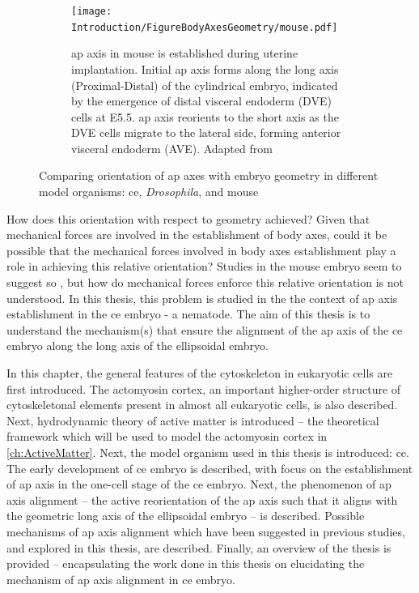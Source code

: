\begin{figure}[p]
\begin{subfigure}{\textwidth}
\end{subfigure}
\hfill
\begin{subfigure}{\textwidth}
    \centering
    \texttt{[image: Introduction/FigureBodyAxesGeometry/mouse.pdf]}
    \caption{\acs{ap} axis in mouse is established during uterine implantation. Initial \acs{ap} axis forms along the long axis (Proximal-Distal) of the cylindrical embryo, indicated by the emergence of distal visceral endoderm (DVE) cells at E5.5. \acs{ap} axis reorients to the short axis as the DVE cells migrate to the lateral side, forming anterior visceral endoderm (AVE). Adapted from \cite{matsuo2017mechanical}}
    \label{subfig:compareBodyAxesEmbryoGeometry-apAxisMouse}
\end{subfigure}

\caption[Comparing orientation of \acs{ap} axis with geometry]{Comparing orientation of \acs{ap} axes with embryo geometry in different model organisms: \acs{ce}, \textit{Drosophila}, and mouse}
\label{fig:compareBodyAxesEmbryoGeometry}

\end{figure}

How does this orientation with respect to geometry achieved? Given that mechanical forces are involved in the establishment of body axes, could it be possible that the mechanical forces involved in body axes establishment play a role in achieving this relative orientation? Studies in the mouse embryo seem to suggest so \citep{vianello2019understanding,hiramatsu2013external,matsuo2017mechanical}, but how do mechanical forces enforce this relative orientation is not understood. In this thesis, this problem is studied in the the context of \ac{ap} axis establishment in the \ac{ce} embryo - a nematode. The aim of this thesis is to understand the mechanism(s) that ensure the alignment of the \ac{ap} axis of the \ac{ce} embryo along the long axis of the ellipsoidal embryo. 

In this chapter, the general features of the cytoskeleton in eukaryotic cells are first introduced. The actomyosin cortex, an important higher-order structure of cytoskeletonal elements present in almost all eukaryotic cells, is also described. Next, hydrodynamic theory of active matter is introduced -- the theoretical framework which will be used to model the actomyosin cortex in \autoref{ch:ActiveMatter}. Next, the model organism used in this thesis is introduced: \acl{ce}. The early development of \ac{ce} embryo is described, with focus on the establishment of \ac{ap} axis in the one-cell stage of the \ac{ce} embryo. Next, the phenomenon of \ac{ap} axis alignment -- the active reorientation of the \ac{ap} axis such that it aligns with the geometric long axis of the ellipsoidal embryo -- is described. Possible mechanisms of \ac{ap} axis alignment which have been suggested in previous studies, and explored in this thesis, are described. Finally, an overview of the thesis is provided -- encapsulating the work done in this thesis on elucidating the mechanism of \ac{ap} axis alignment in \ac{ce} embryo.

